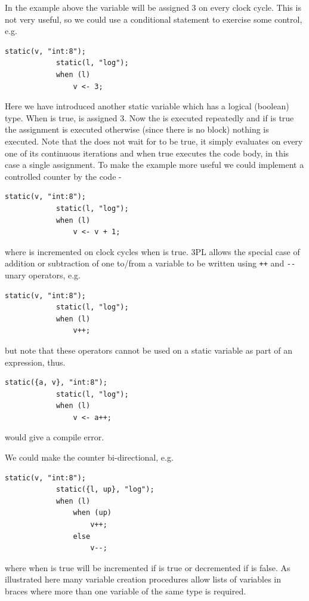         In the example above the variable  will be assigned 3 on every clock
        cycle. This is not very useful, so we could use a conditional statement
        to exercise some control, e.g. 
        \begin{lstlisting}[language=threepl]
            static(v, "int:8");
            static(l, "log");
            when (l)
                v <- 3;
        \end{lstlisting}
        Here we have introduced another static variable  which has a logical
        (boolean) type. When  is true,  is assigned 3. Now the
         is executed repeatedly and if  is true the assignment is
        executed otherwise (since there is no  block) nothing is executed.
        Note that the  does not wait for  to be true, it simply
        evaluates  on every one of its continuous iterations and when
        true executes the code body, in this case a single assignment. To make the
        example more useful we could implement a controlled counter by the code -
        \begin{lstlisting}[language=threepl]
            static(v, "int:8");
            static(l, "log");
            when (l)
                v <- v + 1;
        \end{lstlisting}
        where  is incremented on clock cycles when  is true. 3PL
        allows the special case of addition or subtraction of one to/from a variable
        to be written using \verb'++' and \verb'--' unary operators, e.g.
        \begin{lstlisting}[language=threepl]
            static(v, "int:8");
            static(l, "log");
            when (l)
                v++;
        \end{lstlisting}
        but note that these operators cannot be used on a static variable as part
        of an expression, thus.
        \begin{lstlisting}[language=threepl]
            static({a, v}, "int:8");
            static(l, "log");
            when (l)
                v <- a++;
        \end{lstlisting}
        would give a compile error.
        
        We could make the counter bi-directional, e.g.
        \begin{lstlisting}[language=threepl]
            static(v, "int:8");
            static({l, up}, "log");
            when (l)
                when (up)
                    v++;
                else
                    v--;
        \end{lstlisting}
        where when  is true  will be incremented if  is true
        or decremented if  is false. As illustrated here many variable
        creation procedures allow lists of variables in braces where more than
        one variable of the same type is required.


